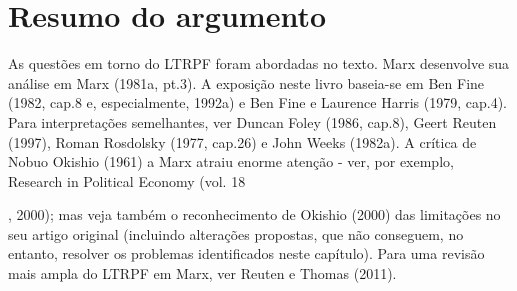 \section{Resumo do argumento}
 \par 
As questões em torno do LTRPF foram abordadas no texto. Marx desenvolve sua análise em Marx (1981a, pt.{\color{blue}3}). A exposição neste livro baseia-se em Ben Fine (1982, cap.{\color{blue}8} e, especialmente, 1992a) e Ben Fine e Laurence Harris (1979, cap.{\color{blue}4}). Para interpretações semelhantes, ver Duncan Foley (1986, cap.{\color{blue}8}), Geert Reuten (1997), Roman Rosdolsky (1977, cap.{\color{blue}26}) e John Weeks (1982a). A crítica de Nobuo Okishio (1961) a Marx atraiu enorme atenção - ver, por exemplo, Research in Political Economy (vol. {\color{blue} 18 } {\par} , 2000); mas veja também o reconhecimento de Okishio (2000) das limitações no seu artigo original (incluindo alterações propostas, que não conseguem, no entanto, resolver os problemas identificados neste capítulo). Para uma revisão mais ampla do LTRPF em Marx, ver Reuten e Thomas (2011).